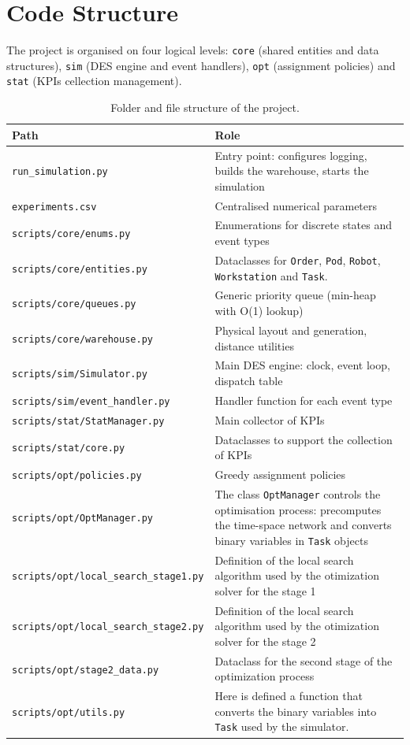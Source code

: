 \documentclass[a4paper,10pt]{article}
\begin{document}
\section{Code Structure}

The project is organised on four logical levels: \texttt{core} (shared entities and data structures), \texttt{sim} (DES engine and event handlers), \texttt{opt} (assignment policies) and \texttt{stat} (KPIs cellection management).

\begin{table}[htbp]
\begin{tabularx}{\textwidth}{l X}
\toprule
\textbf{Path} & \textbf{Role} \\
\midrule
\texttt{run\_simulation.py}          & Entry point: configures logging, builds the warehouse, starts the simulation \\
\texttt{experiments.csv}             & Centralised numerical parameters \\
\texttt{scripts/core/enums.py}       & Enumerations for discrete states and event types \\
\texttt{scripts/core/entities.py}    & Dataclasses for \texttt{Order}, \texttt{Pod}, \texttt{Robot}, \texttt{Workstation} and \texttt{Task}. \\
\texttt{scripts/core/queues.py}      & Generic priority queue (min-heap with O(1) lookup) \\
\texttt{scripts/core/warehouse.py}   & Physical layout and generation, distance utilities \\
\texttt{scripts/sim/Simulator.py}    & Main DES engine: clock, event loop, dispatch table \\
\texttt{scripts/sim/event\_handler.py} & Handler function for each event type \\
\texttt{scripts/stat/StatManager.py} & Main collector of KPIs \\
\texttt{scripts/stat/core.py}        & Dataclasses to support the collection of KPIs \\
\texttt{scripts/opt/policies.py}     & Greedy assignment policies \\
\texttt{scripts/opt/OptManager.py}   & The class \texttt{OptManager} controls the optimisation process: precomputes the time-space network and converts binary variables in \texttt{Task} objects\\
\texttt{scripts/opt/local\_search\_stage1.py} & Definition of the local search algorithm used by the otimization solver for the stage  1\\
\texttt{scripts/opt/local\_search\_stage2.py} & Definition of the local search algorithm used by the otimization solver for the stage  2\\
\texttt{scripts/opt/stage2\_data.py}  & Dataclass for the second stage of the optimization process \\
\texttt{scripts/opt/utils.py}  & Here is defined a function that converts the binary variables into \texttt{Task} used by the simulator. \\
\bottomrule
\end{tabularx}
\caption{Folder and file structure of the project.}
\end{table}
\end{document}
